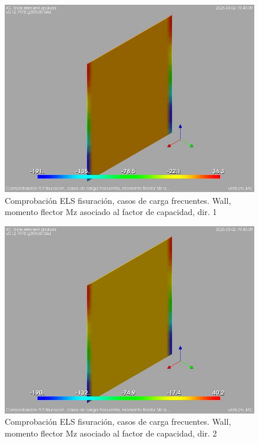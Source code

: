 \begin{figure}[ht]
\begin{center}
\includegraphics[width=\linewidth]{results/graphics/crackingSLS_freq/wallMzSect1}
\caption{Comprobación ELS fisuración, casos de carga frecuentes. Wall, momento flector Mz asociado al factor de capacidad, dir. 1}
\label{SLS_frequentLoadsCrackControlwallMzSect1}
\end{center}
\end{figure}
\begin{figure}[ht]
\begin{center}
\includegraphics[width=\linewidth]{results/graphics/crackingSLS_freq/wallMzSect2}
\caption{Comprobación ELS fisuración, casos de carga frecuentes. Wall, momento flector Mz asociado al factor de capacidad, dir. 2}
\label{SLS_frequentLoadsCrackControlwallMzSect2}
\end{center}
\end{figure}
